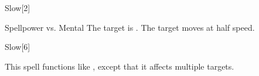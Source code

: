 \begin{spellsection}{Slow}[2]
    \begin{spellheader}
    \end{spellheader}
    \begin{spellcontent}
        \begin{spelltargetinginfo}
        \end{spelltargetinginfo}
        \begin{spelleffects}
            \begin{spellattack}{Spellpower vs. Mental}
                \spellsuccess The target is \slowed.
                \spellfailure The target moves at half speed.
            \end{spellattack}
            \spelldur \durshort
        \end{spelleffects}
    \end{spellcontent}
    \begin{spellfooter}
        \miscastrandom
    \end{spellfooter}
\end{spellsection}

\begin{spellsection}[Mass]{Slow}[6]
    \begin{spellheader}
    \end{spellheader}
    \begin{spellcontent}
        \begin{spelltargetinginfo}
        \end{spelltargetinginfo}
        \begin{spelleffects}
            \spellspecial This spell functions like , except that it affects multiple targets.
        \end{spelleffects}
    \end{spellcontent}
    \begin{spellfooter}
        \miscastexplode
    \end{spellfooter}
\end{spellsection}

